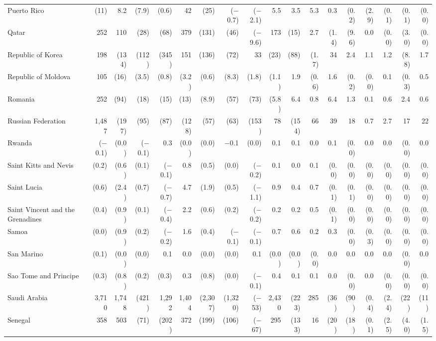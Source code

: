 \begin{longtable}{lrrrrrrrrrrrrrrrrr}
Puerto Rico & (11) & 8.2 & (7.9) & (0.6) & 42 & (25) & ($-$0.7) & ($-$2.1) & 5.5 & 3.5 & 5.3 & 0.3 & (0.2) & (2.9) & (0.1) & (0.1) & (0.0) \\
Qatar & 252 & 110 & (28) & (68) & 379 & (131) & (46) & ($-$9.6) & 173 & (15) & 2.7 & (1.4) & (9.6) & 0.0 & (0.0) & (3.0) & (0.0) \\
Republic of Korea & 198 & (134) & (112) & (345) & 151 & (136) & (72) & 33 & (23) & (88) & (1.7) & 34 & 2.4 & 1.1 & 1.2 & (8.8) & 1.7 \\
Republic of Moldova & 105 & (16) & (3.5) & (0.8) & (3.2) & (0.6) & (8.3) & (1.8) & (1.1) & 1.9 & (0.6) & 1.6 & (0.2) & (0.0) & 0.1 & (0.3) & 0.5 \\
Romania & 252 & (94) & (18) & (15) & (13) & (8.9) & (57) & (73) & (5.8) & 6.4 & 0.8 & 6.4 & 1.3 & 0.1 & 0.6 & 2.4 & 0.6 \\
Russian Federation & 1,487 & (197) & (95) & (87) & (128) & (57) & (63) & (153) & 78 & (154) & 66 & 39 & 18 & 0.7 & 2.7 & 17 & 22 \\
Rwanda & ($-$0.1) & (0.0) & ($-$0.1) & 0.3 & (0.0) & (0.0) & $-$0.1 & (0.0) & 0.1 & 0.1 & 0.0 & 0.1 & (0.0) & 0.0 & 0.0 & (0.0) & 0.0 \\
Saint Kitts and Nevis & (0.2) & (0.6) & (0.1) & ($-$0.1) & 0.8 & (0.5) & (0.0) & ($-$0.2) & 0.1 & 0.0 & 0.1 & (0.0) & (0.0) & (0.0) & (0.0) & (0.0) & (0.0) \\
Saint Lucia & (0.6) & (2.4) & (0.7) & ($-$0.7) & 4.7 & (1.9) & (0.5) & ($-$1.1) & 0.9 & 0.4 & 0.7 & (0.1) & (0.1) & (0.0) & (0.0) & (0.0) & (0.0) \\
Saint Vincent and the Grenadines & (0.4) & (0.9) & (0.1) & ($-$0.4) & 2.2 & (0.6) & (0.2) & ($-$0.2) & 0.2 & 0.2 & 0.5 & (0.1) & (0.0) & (0.0) & (0.0) & (0.0) & (0.0) \\
Samoa & (0.0) & (0.9) & (0.2) & ($-$0.2) & 1.6 & (0.4) & ($-$0.1) & ($-$0.1) & 0.7 & 0.6 & 0.2 & 0.3 & (0.0) & (0.3) & (0.0) & (0.0) & (0.0) \\
San Marino & (0.1) & (0.0) & (0.0) & 0.1 & 0.0 & (0.0) & (0.0) & 0.1 & (0.0) & (0.0) & (0.0) & 0.0 & 0.0 & 0.0 & 0.0 & (0.0) & 0.0 \\
Sao Tome and Principe & (0.3) & (0.8) & (0.2) & (0.3) & 0.3 & (0.8) & (0.0) & ($-$0.1) & 0.4 & 0.1 & 0.1 & 0.0 & (0.0) & 0.0 & (0.0) & (0.0) & (0.0) \\
Saudi Arabia & 3,710 & 1,748 & (421) & 1,292 & 1,404 & (2,307) & (1,320) & ($-$53) & 2,430 & (223) & 285 & (36) & (90) & (0.4) & (2.4) & (22) & (11) \\
Senegal & 358 & 503 & (71) & (202) & 372 & (199) & (106) & ($-$67) & 295 & (133) & 16 & (20) & (18) & (0.1) & (2.5) & (4.0) & (1.5) \\

\end{longtable}
